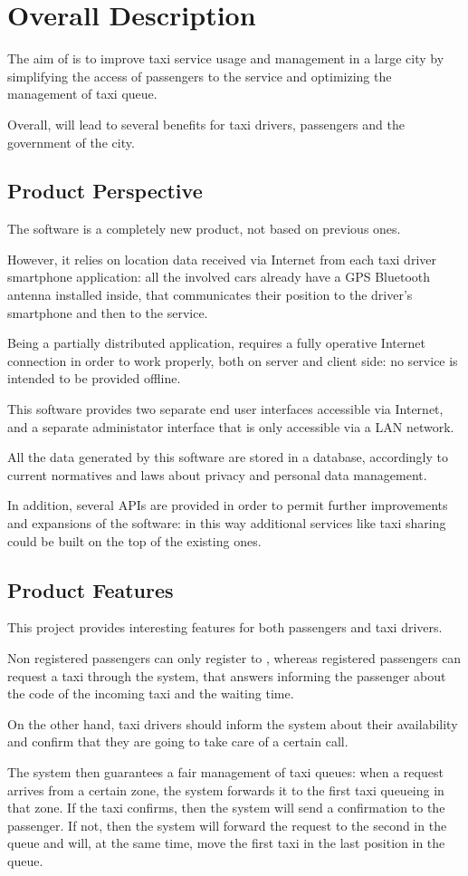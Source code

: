 \section{Overall Description}
The aim of \myTaxiService{} is to improve taxi service usage and management in a large city by simplifying the access of passengers to the service and optimizing the management of taxi queue.\par
Overall, \myTaxiService{} will lead to several benefits for taxi drivers, passengers and the government of the city.
\subsection{Product Perspective}
The software \myTaxiService{} is a completely new product, not based on previous ones.\par
However, it relies on location data received via Internet from each taxi driver smartphone application: all the involved cars already have a GPS Bluetooth antenna installed inside, that communicates their position to the driver's smartphone and then to the service.\par
Being a partially distributed application, \myTaxiService{} requires a fully operative Internet connection in order to work properly, both on server and client side: no service is intended to be provided offline.\par
This software provides two separate end user interfaces accessible via Internet, and a separate administator interface that is only accessible via a LAN network.\par
All the data generated by this software are stored in a database, accordingly to current normatives and laws about privacy and personal data management.\par
In addition, several APIs are provided in order to permit further improvements and expansions of the software: in this way additional services like taxi sharing could be built on the top of the existing ones.
\subsection{Product Features}
This project provides interesting features for both passengers and taxi drivers.\par
Non registered passengers can only register to \myTaxiService{}, whereas registered passengers can request a taxi through the system, that answers informing the passenger about the code of the incoming taxi and the waiting time.\par
On the other hand, taxi drivers should inform the system about their availability and confirm that they are going to take care of a certain call.\par
The system then guarantees a fair management of taxi queues: when a request arrives from a certain zone, the system forwards it to the first taxi queueing in that zone.
If the taxi confirms, then the system will send a confirmation to the passenger.
If not, then the system will forward the request to the second in the queue and will, at the same time, move the first taxi in the last position in the queue.

